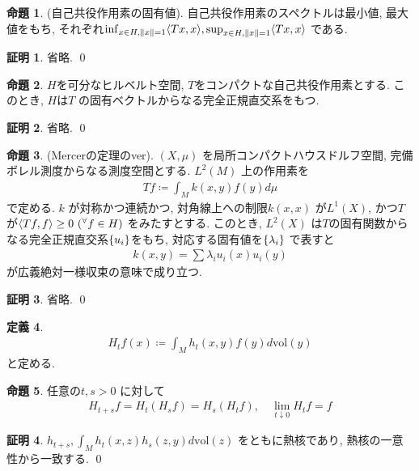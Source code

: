 \documentclass[10pt, fleqn, label-section=none]{bxjsarticle}
\theoremstyle{definition}
\newtheorem{dfn}{定義}[section]
\newtheorem{prop}[dfn]{命題}
\newtheorem*{pf*}{証明}
\newcommand{\any}{{}^{\forall}}
\newcommand{\cbra}[1]{\mleft\{#1\mright\}}
\newcommand{\tbra}[1]{\mleft\langle#1\mright\rangle}
\newcommand{\norm}[1]{\left\|#1\right\|}
\newcommand{\vol}{\textrm{vol}}
\renewcommand{\-}{\hyphen}
\begin{document}
\begin{prop}(自己共役作用素の固有値).
自己共役作用素のスペクトルは最小値, 最大値をもち, それぞれ$\inf_{x \in H, \norm x = 1} \tbra{Tx, x}, \sup_{x \in H, \norm x = 1} \tbra{Tx, x}$ である.
\end{prop}
\begin{pf*}
省略.
\qed
\end{pf*}


\begin{prop}
$H$を可分なヒルベルト空間, $T$をコンパクトな自己共役作用素とする. このとき, $H$は$T$ の固有ベクトルからなる完全正規直交系をもつ. 
\end{prop}
\begin{pf*}
省略.
\qed
\end{pf*}

\begin{prop}(Mercerの定理のver). $(X,\mu)$ を局所コンパクトハウスドルフ空間, 完備ボレル測度からなる測度空間とする. $L^2(M)$ 上の作用素を
\begin{align*} Tf \coloneqq \int_M k(x,y) f(y) d \mu  \end{align*}
で定める. $k$ が対称かつ連続かつ, 対角線上への制限$k(x,x)$ が$L^1(X)$, かつ$T$が$\tbra{Tf, f} \geq 0 \,\, (\any f \in H)$ をみたすとする. このとき, $L^2(X)$ は$T$の固有関数からなる完全正規直交系$\cbra{u_i}$をもち, 対応する固有値を$\cbra{\lambda _i}$ で表すと
\begin{align*} k(x,y) = \sum \lambda_i u_i(x) u_i (y) \end{align*}
が広義絶対一様収束の意味で成り立つ.
\end{prop}
\begin{pf*}
省略.
\qed
\end{pf*}


\begin{dfn}
\begin{align*} H_t f (x) \coloneqq \int_M h_t(x,y)f(y) d \vol(y) \end{align*}
と定める.
\end{dfn}

\begin{prop}任意の$t,s >0$ に対して
\begin{align*} H_{t+s}f = H_t(H_s f) = H_s(H_t f), \quad \lim_{t \downarrow 0}H_{t}f = f \end{align*}
\end{prop}
\begin{pf*}
$h_{t+s}, \int_M h_t(x,z)h_s(z,y) d \vol(z) $ をともに熱核であり, 熱核の一意性から一致する. 
\qed
\end{pf*}
\end{document}
